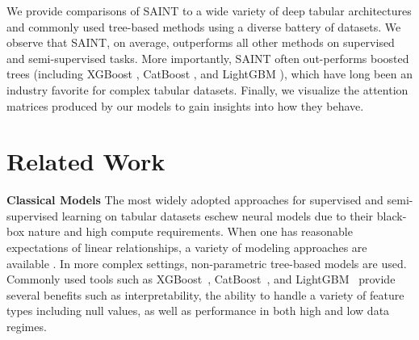 \documentclass{article}
\newcommand{\gowthami}[1]{\textcolor{red}{#1}}
\newcommand{\bayan}[1]{\textcolor{cyan}{#1}}
\begin{document}
We provide comparisons of SAINT to a wide variety of deep tabular architectures and commonly used tree-based methods using a diverse battery of datasets. We observe that SAINT, on average, outperforms all other methods on supervised and semi-supervised tasks.  More importantly, SAINT often out-performs boosted trees (including  XGBoost \cite{chen2016xgboost}, CatBoost \cite{dorogush2018catboost}, and LightGBM \cite{ke2017lightgbm}), which have long been an industry favorite for complex tabular datasets.
Finally, we visualize the attention matrices produced by our models to gain insights into how they behave.




\section{Related Work}
\label{sec:related_work}
\textbf{Classical Models}
The most widely adopted approaches for supervised and semi-supervised learning on tabular datasets eschew neural models due to their black-box nature and high compute requirements. When one has reasonable expectations of linear relationships, a variety of modeling approaches are available \cite{wright1995logistic,weisberg2005applied,starkweather2011multinomial,mcculloch2005generalized}. In more complex settings, non-parametric tree-based models are used. Commonly used tools such as XGBoost~\cite{chen2016xgboost}, CatBoost~\cite{dorogush2018catboost}, and LightGBM~\cite{ke2017lightgbm} provide several benefits such as interpretability, the ability to handle a variety of feature types including null values, as well as performance in both high and low data regimes.
\end{document}

